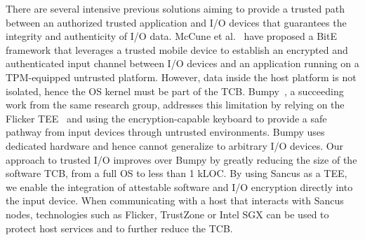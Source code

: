 There are several intensive previous solutions aiming to provide a trusted path
between an authorized trusted application and I/O devices that guarantees the
integrity and authenticity of I/O data. McCune et al.~\cite{bite} have proposed
a BitE framework that leverages a trusted mobile device to establish an
encrypted and authenticated input channel between I/O devices and an application
running on a TPM-equipped untrusted platform. However, data inside the host
platform is not isolated, hence the OS kernel must be part of the TCB.
Bumpy~\cite{bumpy}, a succeeding work from the same research group, addresses
this limitation by relying on the Flicker TEE~\cite{flicker} and using the
encryption-capable keyboard to provide a safe pathway from input devices through
untrusted environments. Bumpy uses dedicated hardware and hence cannot
generalize to arbitrary I/O devices. Our approach to trusted I/O improves over
Bumpy by greatly reducing the size of the software TCB, from a full OS to less
than 1 kLOC. By using Sancus as a TEE, we enable the integration of attestable
software and I/O encryption directly into the input device. When communicating
with a host that interacts with Sancus nodes, technologies such as Flicker,
TrustZone or Intel \ac{SGX} can be used to protect host services and to further
reduce the TCB.

